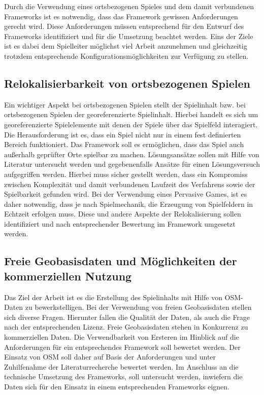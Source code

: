 Durch die Verwendung eines ortsbezogenen Spieles und dem damit verbundenen Frameworks ist es notwendig, dass das Framework gewissen Anforderungen gerecht wird. Diese Anforderungen müssen entsprechend für den Entwurf des Frameworks identifiziert und für die Umsetzung beachtet werden. Eins der Ziele ist es dabei dem Spielleiter möglichst viel Arbeit anzunehmen und gleichzeitig trotzdem entsprechende Konfigurationsmöglichkeiten zur Verfügung zu stellen.

\subsection*{Relokalisierbarkeit von ortsbezogenen Spielen}

Ein wichtiger Aspekt bei ortsbezogenen Spielen stellt der Spielinhalt bzw. bei ortsbezogenen Spielen der georeferenzierte Spielinhalt. Hierbei handelt es sich um georeferenzierte Spielelemente mit denen der Spiele über das Spielfeld interagiert. Die Herausforderung ist es, dass ein Spiel nicht nur in einem fest definierten Bereich funktioniert. Das Framework soll es ermöglichen, dass das Spiel auch außerhalb geprüfter Orte spielbar zu machen. Lösungsansätze sollen mit Hilfe von Literatur untersucht werden und gegebenenfalls Ansätze für einen Lösungsversuch aufgegriffen werden. Hierbei muss sicher gestellt werden, dass ein Kompromiss zwischen Komplexität und damit verbundenen Laufzeit des Verfahrens sowie der Spielbarkeit gefunden wird. Bei der Verwendung eines Pervasive Games, ist es daher notwendig, dass je nach Spielmechanik, die Erzeugung von Spielfeldern in Echtzeit erfolgen muss. Diese und andere Aspekte der Relokalisierung sollen identifiziert und nach entsprechender Bewertung im Framework umgesetzt werden.

\subsection*{Freie Geobasisdaten und Möglichkeiten der kommerziellen Nutzung}

Das Ziel der Arbeit ist es die Erstellung des Spielinhalts mit Hilfe von OSM-Daten zu bewerkstelligen.
Bei der Verwendung von freien Geobasisdaten stellen sich diverse Fragen. Hierunter fallen die Qualität der Daten, als auch die Frage nach der entsprechenden Lizenz. Freie Geobasisdaten stehen in Konkurrenz zu kommerziellen Daten. Die Verwendbarkeit von Ersteren im Hinblick auf die Anforderungen für ein entsprechendes Framework soll bewertet werden.
Der Einsatz von OSM soll daher auf Basis der Anforderungen und unter Zuhilfenahme der Literaturrecherche bewertet werden. Im Anschluss an die technische Umsetzung des Frameworks, soll untersucht werden, inwiefern die Daten sich für den Einsatz in einem entsprechenden Frameworks eignen.